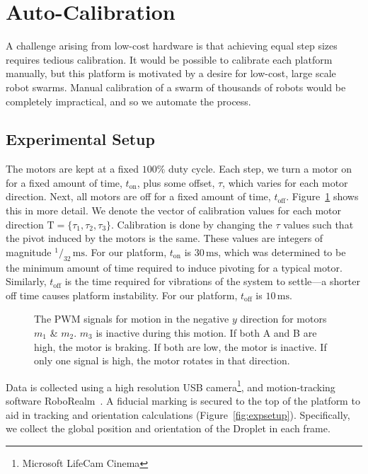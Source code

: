 \documentclass[letterpaper, 10pt, conference]{ieeeconf}
\newcommand{\Tau}{\boldsymbol{\mathrm{T}}}
\begin{document}
\section{Auto-Calibration}
A challenge arising from low-cost hardware is that achieving equal step sizes requires tedious calibration.
It would be possible to calibrate each platform manually, but this platform is motivated by a desire for low-cost, large scale robot swarms.  Manual calibration of a swarm of thousands of robots would be completely impractical, and so we automate the process. 

\subsection{Experimental Setup}
The motors are kept at a fixed $100\%$ duty cycle. Each step, we turn a motor on for a fixed amount of time, $t_{\text{on}}$, plus some offset, $\tau$,  which varies for each motor direction. Next, all motors are off for a fixed amount of time, $t_{\text{off}}$. Figure~\ref{fig:pwmSignals} shows this in more detail. We denote the vector of calibration values for each motor direction $\Tau=\{\tau_1, \tau_2, \tau_3\}$. Calibration is done by changing the $\tau$ values such that the pivot induced by the motors is the same. These values are integers of magnitude $^1/_{32}\,\mathrm{ms}$. For our platform, $t_{\text{on}}$ is $30\,\mathrm{ms}$, which was determined to be the minimum amount of time required to induce pivoting for a typical motor. Similarly, $t_{\text{off}}$ is the time required for vibrations of the system to settle---a shorter off time causes platform instability. For our platform, $t_{\text{off}}$ is $10\,\mathrm{ms}$.

\begin{figure}[!htb]
\centering

\caption{The PWM signals for motion in the negative $y$ direction for motors $m_1$ \& $m_2$. $m_3$ is inactive during this motion. If both A and B are high, the motor is braking. If both are low, the motor is inactive. If only one signal is high, the motor rotates in that direction.}
\label{fig:pwmSignals}
\end{figure}

Data is collected using a high resolution USB camera\footnote{Microsoft LifeCam Cinema}, and motion-tracking software RoboRealm~\cite{RoboRealm}. A fiducial marking is secured to the top of the platform to aid in tracking and orientation calculations (Figure~\ref{fig:expsetup}). Specifically, we collect the global position and orientation of the Droplet in each frame.
\end{document}
